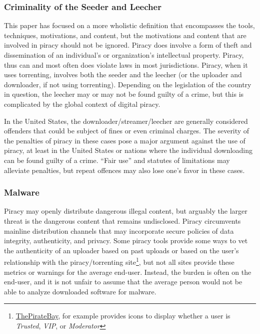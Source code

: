 \documentclass[onecolumn, 12pt]{article}
\begin{document}
\subsubsection{Criminality of the Seeder and Leecher}
This paper has focused on a more wholistic definition that encompasses
the tools, techniques, motivations, and content, but the motivations and
content that are involved in piracy should not be ignored. Piracy does involve
a form of theft and dissemination of an individual's or organization's
intellectual property. Piracy, thus can and most often does violate laws in
most jurisdictions. Piracy, when it uses torrenting, involves both the
seeder and the leecher (or the uploader and downloader, if not using torrenting).
Depending on the legislation of the country in question, the leecher may or
may not be found guilty of a crime, but this is complicated by the global
context of digital piracy.

In the United States, the downloader/streamer/leecher are generally considered
offenders that could be subject of fines or even criminal charges. The severity
of the penalties of piracy in these cases pose a major argument against the use
of piracy, at least in the United States or nations where the individual
downloading can be found guilty of a crime. ``Fair use'' and statutes of
limitations may alleviate penalties, but repeat offences may also lose one's
favor in these cases.~\cite{felonies.org}

\subsubsection{Malware}
Piracy may openly distribute dangerous illegal content, but arguably the
larger threat is the dangerous content that remains undisclosed. Piracy
circumvents mainline distribution channels that may incorporate secure policies
of data integrity, authenticity, and privacy. Some piracy tools provide
some ways to vet the authenticity of an uploader based on past uploads or based
on the user's relationship with the piracy/torrenting
site\footnote{%
  \href{https://pirates-forum.org/Thread-ThePirateBay-Want-Trusted-VIP-Status-Pink-Green-Skull-See-Here}{ThePirateBay},
  for example provides icons to display whether a user is \emph{Trusted},
  \emph{VIP}, or \emph{Moderator}%
}, but not all sites provide these metrics or warnings for the average end-user.
Instead, the burden is often on the end-user, and it is not unfair to assume
that the average person would not be able to analyze downloaded software for
malware.
\end{document}
